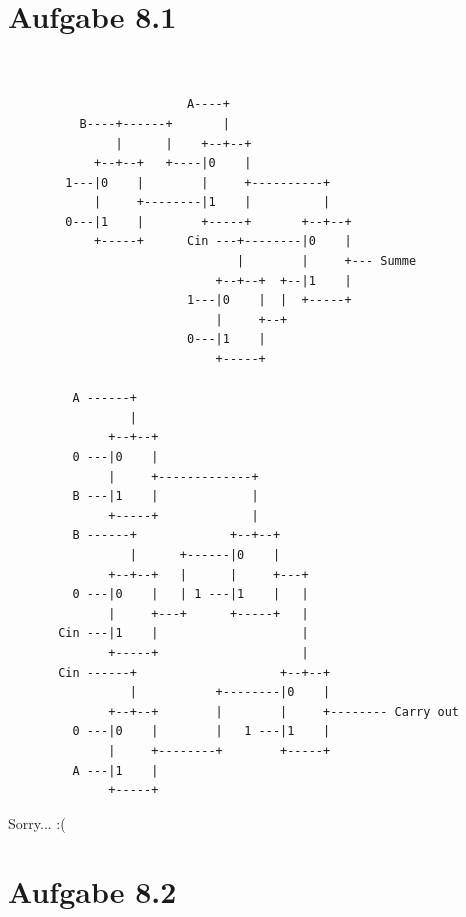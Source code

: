 \documentclass[a4paper]{scrartcl}
\title{\titleinfo}
\author{Arne Struck 6326505, The-Vinh Jackie Huynh 6388888, \\Tronje Krabbe 6435002}
\date{\today}
\begin{document}
\maketitle
\notag

\section{Aufgabe 8.1}
	\begin{scriptsize}
	\begin{verbatim}
                                       
                                       
                         A----+          
          B----+------+       |       
               |      |    +--+--+    
            +--+--+   +----|0    |                  
        1---|0    |        |     +----------+       
            |     +--------|1    |          |       
        0---|1    |        +-----+       +--+--+    
            +-----+      Cin ---+--------|0    |    
                                |        |     +--- Summe
                             +--+--+  +--|1    |    
                         1---|0    |  |  +-----+    
                             |     +--+
                         0---|1    | 
                             +-----+ 

         A ------+
                 |   
              +--+--+
         0 ---|0    |
              |     +-------------+
         B ---|1    |             |
              +-----+             |          
         B ------+             +--+--+     
                 |      +------|0    |     
              +--+--+   |      |     +---+
         0 ---|0    |   | 1 ---|1    |   |
              |     +---+      +-----+   |        
       Cin ---|1    |                    |
              +-----+                    |   
       Cin ------+                    +--+--+
                 |           +--------|0    |
              +--+--+        |        |     +-------- Carry out
         0 ---|0    |        |   1 ---|1    |
              |     +--------+        +-----+
         A ---|1    |
              +-----+
	\end{verbatim}
	\end{scriptsize}
	\begin{tiny}
	Sorry... :(
	\end{tiny}
\section{Aufgabe 8.2}
\end{document}
